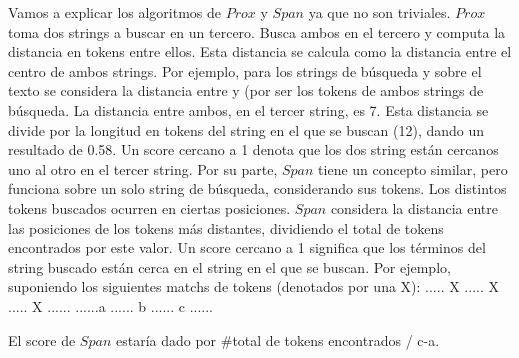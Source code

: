 Vamos a explicar los algoritmos de $Prox$ y $Span$ ya que no son triviales. \newline
$Prox$ toma dos strings a buscar en un tercero. Busca ambos en el tercero y computa la distancia en tokens entre ellos.
Esta distancia se calcula como la distancia entre el centro de ambos strings.
Por ejemplo, para los strings de búsqueda  y  sobre el texto  se considera la distancia entre  y  (por ser los tokens  de ambos strings
de búsqueda. La distancia entre ambos, en el tercer string, es 7. Esta distancia se divide por la longitud en tokens del string en el que se buscan (12), dando un resultado de 0.58. Un score cercano a 1 denota que los dos string están cercanos uno al otro en el tercer string. \newline
Por su parte, $Span$ tiene un concepto similar, pero funciona sobre un solo string de búsqueda, considerando sus tokens. Los distintos tokens buscados ocurren en ciertas posiciones. $Span$ considera la distancia entre las posiciones de los tokens más distantes, dividiendo el total de tokens encontrados por este valor.
Un score cercano a 1 significa que los términos del string buscado están cerca en el string en el que se buscan.
Por ejemplo, suponiendo los siguientes matchs de tokens (denotados por una X): \newline
..... X ..... X ..... X ...... \newline
......a ...... b ...... c ...... \newline

El score de $Span$ estaría dado por \#total de tokens encontrados /  {\textbar}c-a{\textbar}.
